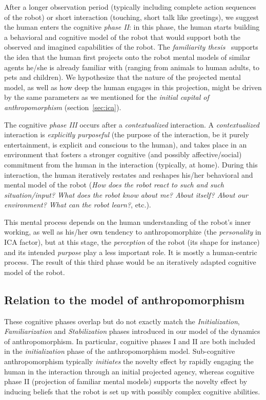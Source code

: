 \documentclass{frontiersSCNS} %
\begin{document}
After a longer observation period (typically including complete action sequences
of the robot) or short interaction (touching, short talk like greetings), we
suggest the human enters the cognitive \emph{phase II}: in this phase, the human
starts building a behavioral and cognitive model of the robot that would support
both the observed and imagined capabilities of the robot.  The \emph{familiarity
thesis}~\cite{hegel_understanding_2008} supports the idea that the human
first projects onto the robot mental models of similar agents he/she is already
familiar with (ranging from animals to human adults, to pets and children). We 
hypothesize that the nature of the projected mental
model, as well as how deep the human engages in this projection, might be
driven by the same parameters as we mentioned for the \emph{initial capital of
anthropomorphism} (section~\ref{sec:ica}).

The cognitive \emph{phase III} occurs after a \emph{contextualized} interaction.
A \emph{contextualized} interaction is \emph{explicitly purposeful} (the purpose
of the interaction, be it purely entertainment, is explicit and conscious to the
human), and takes place in an environment that fosters a stronger cognitive (and
possibly affective/social) commitment from the human in the interaction
(typically, at home). During this interaction, the human iteratively restates
and reshapes his/her behavioral and mental model of the robot (\emph{How does
the robot react to such and such situation/input?  What does the robot know
about me? About itself? About our environment? What can the robot learn?}, etc.).

This mental process depends on the human understanding of the robot's
inner working, as well as his/her own tendency to anthropomorphize (the
\emph{personality} in ICA factor), but at this
stage, the \emph{perception} of the robot (its shape for instance) and its
intended \emph{purpose} play a less important role. It is mostly a human-centric
process.  The result of this third phase would be an iteratively adapted
cognitive model of the robot.


\subsection{Relation to the model of anthropomorphism}

These cognitive phases overlap but do not exactly match the
\emph{Initialization}, \emph{Familiarization} and \emph{Stabilization} phases
introduced in our model of the dynamics of anthropomorphism. In particular,
cognitive phases I and II are both included in the \emph{initialization} phase
of the anthropomorphism model. Sub-cognitive anthropomorphism typically
\emph{initiates} the novelty effect by rapidly engaging the human in the
interaction through an initial projected agency, whereas cognitive phase II
(projection of familiar mental models) supports the novelty effect by inducing
beliefs that the robot is set up with possibly complex cognitive abilities.
\end{document}
